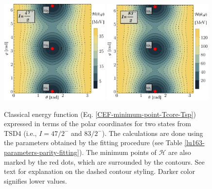 \begin{figure}
    \centering
    \includegraphics[width=0.49\textwidth]{Chapters/Figures/parity-partners-plots/contour-tsd4-1.pdf}
    \includegraphics[width=0.49\textwidth]{Chapters/Figures/parity-partners-plots/contour-tsd4-2.pdf}
    \caption{Classical energy function (Eq. \ref{CEF-minimum-point-Tcore-Tsp}) expressed in terms of the polar coordinates for two states from TSD4 (i.e., $I=47/2^-$ and $83/2^-$). The calculations are done using the parameters obtained by the fitting procedure (see Table \ref{lu163-parameters-parity-fitting}). The minimum points of $\mathcal{H}$ are also marked by the red dots, which are surrounded by the contours. See text for explanation on the dashed contour styling. Darker color signifies lower values.}
    \label{contour-cef-polar-tsd4}
\end{figure}

